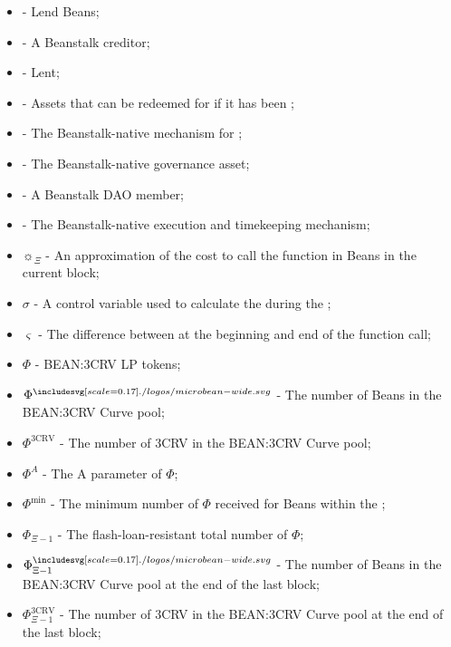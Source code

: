 \documentclass[class=article, crop=false]{standalone}
\begin{document}
\begin{itemize}[topsep=0pt, itemsep=3pt,leftmargin=16pt]
    \item[]  - \hypertarget{ht179}{Lend Beans};
    \item[]  - \hypertarget{ht180}{A Beanstalk creditor};
    \item[]  - \hypertarget{ht181}{Lent};
    \item[]  - \hypertarget{ht182}{Assets that can be redeemed for  if it has been };
    \item[]  - \hypertarget{ht183}{The Beanstalk-native mechanism for };
    \item[]  - \hypertarget{ht184}{The Beanstalk-native governance asset};
    \item[]  - \hypertarget{ht185}{A Beanstalk DAO member};
    \item[]  - \hypertarget{ht186}{The Beanstalk-native execution and timekeeping mechanism};
    \item[] $\sun_{\Xi}$ - An approximation of the cost to call the  function in Beans in the current block;
    \item[] $\sigma$ - A control variable used to calculate the  during the ;
    \item[] $\varsigma$ - The difference between  at the beginning and end of the  function call;
    \item[] $\Phi$ - \hypertarget{ht187}{BEAN:3CRV LP tokens};
    \item[] $\Phi^{\bean}$ - \hypertarget{ht188}{The number of Beans in the BEAN:3CRV Curve pool};
    \item[] $\Phi^{\text{3CRV}}$ - \hypertarget{ht189}{The number of 3CRV in the BEAN:3CRV Curve pool};
    \item[] $\Phi^{A}$ - \hypertarget{ht190}{The A parameter of $\Phi$};
    \item[] $\Phi^{\text{min}}$ - \hypertarget{ht191}{The minimum number of $\Phi$ received for   Beans within the };
    \item[] $\Phi_{\Xi-1}$ - \hypertarget{ht192}{The flash-loan-resistant total number of $\Phi$};
    \item[] $\Phi_{\Xi-1}^{\bean}$ - \hypertarget{ht193}{The number of Beans in the BEAN:3CRV Curve pool at the end of the last block};
    \item[] $\Phi_{\Xi-1}^{\text{3CRV}}$ - \hypertarget{ht194}{The number of 3CRV in the BEAN:3CRV Curve pool at the end of the last block};

\end{itemize}
\end{document}
